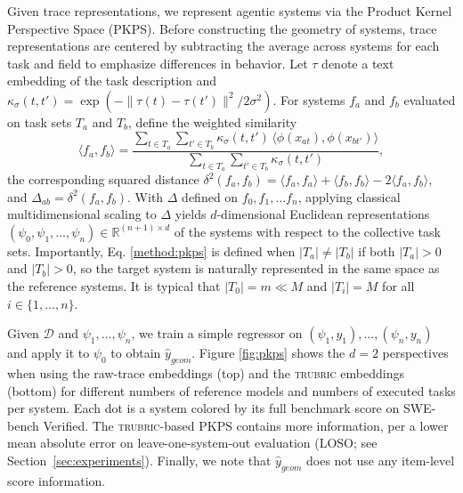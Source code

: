 \documentclass{article}
\newcommand{\trubric}{\textsc{trubric}}
\begin{document}
Given trace representations, we represent agentic systems via the Product Kernel Perspective Space (PKPS).
Before constructing the geometry of systems, trace representations are centered by subtracting the average across systems for each task and field to emphasize differences in behavior.
Let $\tau$ denote a text embedding of the task description and $\kappa_{\sigma}(t, t') = \exp\left(-\| \tau(t) - \tau(t') \|^{2} / 2\sigma^{2}\right)$.
For systems $f_{a}$ and $f_{b}$ evaluated on task sets $T_{a}$ and $T_{b}$, define the weighted similarity
\begin{equation}
\label{method:pkps}
\langle f_a, f_b \rangle = \frac{\sum_{t \in T_{a}} \sum_{t' \in T_{b}} \kappa_{\sigma}(t, t') \, \langle \phi(x_{at}), \phi(x_{bt'}) \rangle}{\sum_{t \in T_{a}} \sum_{t' \in T_{b}} \kappa_{\sigma}(t, t')},
\end{equation}
the corresponding squared distance $\delta^{2}(f_a, f_b) = \langle f_a, f_a \rangle + \langle f_b, f_b \rangle - 2 \langle f_a, f_b \rangle$, and $ \Delta_{ab} = \delta^{2}(f_a,f_b) $. With $ \Delta $ defined on $ f_{0}, f_{1}, \hdots f_{n} $, applying classical multidimensional scaling \citep{torgerson1952mds} to $ \Delta $ yields $d$-dimensional Euclidean representations $(\psi_{0}, \psi_{1}, \hdots, \psi_{n}) \in \mathbb{R}^{(n+1) \times d}$ of the systems with respect to the collective task sets.
Importantly, Eq. \eqref{method:pkps} is defined when $ |T_{a} | \neq |T_{b}| $ if both $ |T_{a}| > 0 $ and $ |T_{b}| > 0 $, so the target system is naturally represented in the same space as the reference systems.
It is typical that $ |T_{0} | = m \ll M $ and $ |T_{i} | = M $ for all $ i \in \{1, \hdots, n\} $.

Given $ \mathcal{D} $ and $ \psi_{1}, \hdots, \psi_{n} $, we train a simple regressor on $ (\psi_{1}, y_{1}), \hdots, (\psi_{n}, y_{n})$ and apply it to $ \psi_{0} $ to obtain $ \hat{y}_{geom} $.
Figure \ref{fig:pkps} shows the $ d=2$ perspectives when using the raw-trace embeddings (top) and the \trubric{} embeddings (bottom) for different numbers of reference models and numbers of executed tasks per system.
Each dot is a system colored by its full benchmark score on SWE-bench Verified.
The \trubric{}-based PKPS contains more information, per a lower mean absolute error on leave-one-system-out evaluation (LOSO; see Section~\ref{sec:experiments}).
Finally, we note that $ \hat{y}_{geom} $ does not use any item-level score information.
\end{document}

